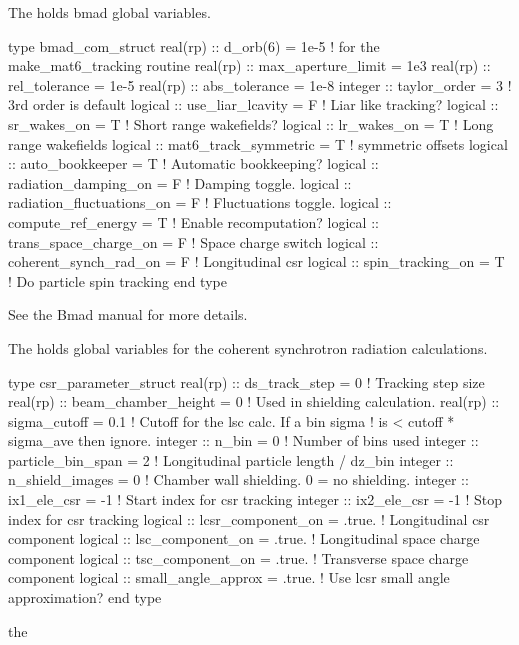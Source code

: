 {{{{{{{{{{The  holds bmad global variables. 
\begin{example}
  type bmad_com_struct
    real(rp) :: d_orb(6) = 1e-5  ! for the make_mat6_tracking routine
    real(rp) :: max_aperture_limit = 1e3    
    real(rp) :: rel_tolerance = 1e-5
    real(rp) :: abs_tolerance = 1e-8
    integer :: taylor_order = 3               ! 3rd order is default
    logical :: use_liar_lcavity = F           ! Liar like tracking?
    logical :: sr_wakes_on = T                ! Short range wakefields?
    logical :: lr_wakes_on = T                ! Long range wakefields
    logical :: mat6_track_symmetric = T       ! symmetric offsets
    logical :: auto_bookkeeper = T            ! Automatic bookkeeping?
    logical :: radiation_damping_on = F       ! Damping toggle.
    logical :: radiation_fluctuations_on = F  ! Fluctuations toggle.
    logical :: compute_ref_energy = T         ! Enable recomputation?
    logical :: trans_space_charge_on = F      ! Space charge switch
    logical :: coherent_synch_rad_on = F      ! Longitudinal csr 
    logical :: spin_tracking_on = T           ! Do particle spin tracking
  end type
\end{example}
See the Bmad manual for more details.

The  holds global variables for the coherent
synchrotron radiation calculations. 
\begin{example}
  type csr_parameter_struct
    real(rp) :: ds_track_step = 0          ! Tracking step size
    real(rp) :: beam_chamber_height = 0    ! Used in shielding calculation.
    real(rp) :: sigma_cutoff = 0.1         ! Cutoff for the lsc calc. If a bin sigma
                                           !  is < cutoff * sigma_ave then ignore.
    integer :: n_bin = 0                   ! Number of bins used
    integer :: particle_bin_span = 2       ! Longitudinal particle length / dz_bin
    integer :: n_shield_images = 0         ! Chamber wall shielding. 0 = no shielding.
    integer :: ix1_ele_csr = -1            ! Start index for csr tracking
    integer :: ix2_ele_csr = -1            ! Stop index for csr tracking
    logical :: lcsr_component_on = .true.  ! Longitudinal csr component
    logical :: lsc_component_on = .true.   ! Longitudinal space charge component
    logical :: tsc_component_on = .true.   ! Transverse space charge component
    logical :: small_angle_approx = .true. ! Use lcsr small angle approximation?
  end type
\end{example}
the \vn{global%
See the Bmad manual for more details.

}}}}}}}}}}}

